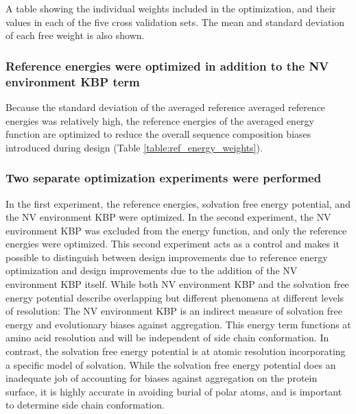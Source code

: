 \begin{table}
\scriptsize
\renewcommand{\tabcolsep}{0.09cm}
\centering

\caption{A table showing the individual weights included in the optimization, and their values in each of the five cross validation sets.  The mean and standard deviation of each free weight is also shown. }
\label{table:energy_weights}
\end{table}

\subsubsection{Reference energies were optimized in addition to the \acs{NV} environment \acs{KBP} term}
Because the standard deviation of the averaged reference averaged reference energies was relatively high, the reference energies of the averaged energy function are optimized to reduce the overall sequence composition biases introduced during design (Table \ref{table:ref_energy_weights}).

\subsubsection{Two separate optimization experiments were performed}
In the first experiment, the reference energies, solvation free energy potential, and the \ac{NV} environment \ac{KBP} were optimized.
In the second experiment, the \ac{NV} environment \ac{KBP} was excluded from the energy function, and only the reference energies were optimized.
This second experiment acts as a control and makes it possible to distinguish between design improvements due to reference energy optimization and design improvements due to the addition of the \ac{NV} environment \ac{KBP} itself.
While both \ac{NV} environment \ac{KBP} and the solvation free energy potential describe overlapping but different phenomena at different levels of resolution: The \ac{NV} environment \ac{KBP} is an indirect measure of solvation free energy and evolutionary biases against aggregation.
This energy term functions at amino acid resolution and will be independent of side chain conformation.
In contrast, the solvation free energy potential is at atomic resolution incorporating a specific model of solvation.
While the solvation free energy potential does an inadequate job of accounting for biases against aggregation on the protein surface, it is highly accurate in avoiding burial of polar atoms, and is important to determine side chain conformation.

